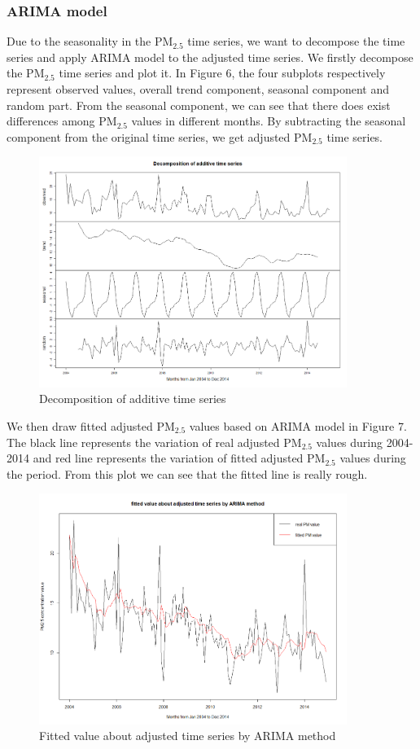 \documentclass[10pt]{article}
\begin{document}
\subsubsection{ARIMA model}
Due to the seasonality in the PM$_{2.5}$ time series, we
want to decompose the time series and apply ARIMA model to the adjusted time
series. We firstly decompose the PM$_{2.5}$ time series and plot it. In Figure
6, the four subplots respectively represent observed values, overall trend
component, seasonal component and random part. From the seasonal component, we
can see that there does exist differences among PM$_{2.5}$ values in different
months. By subtracting the seasonal component from the original time series, we
get adjusted PM$_{2.5}$ time series.

\begin{figure}[H]
\centering
\includegraphics[width = 100mm]{ts4.png}
\caption{Decomposition of additive time series}
\end{figure}

We then draw fitted adjusted PM$_{2.5}$ values based on ARIMA model in Figure 7. The
black line represents the variation of real adjusted PM$_{2.5}$ values during 2004-2014
and red line represents the variation of fitted adjusted PM$_{2.5}$ values during the
period. From this plot we can see that the fitted line is really rough.

\begin{figure}[H]
\centering
\includegraphics[width = 100mm]{ts5.png}
\caption{Fitted value about adjusted time series by ARIMA method}
\end{figure}
\end{document}
